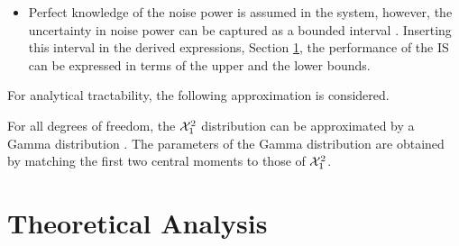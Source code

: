 \begin{itemize}
\item Perfect knowledge of the noise power is assumed in the system, however, the uncertainty in noise power can be captured as a bounded interval \cite{Tan08}. Inserting this interval in the derived expressions,  Section \ref{sec:ana}, the performance of the IS can be expressed in terms of the upper and the lower bounds. 
\end{itemize}
For analytical tractability, the following approximation is considered.
\begin{approxi} \label{ap:ap1}
\normalfont
For all degrees of freedom, the $\ncchi2$ distribution can be approximated by a Gamma distribution \cite{abramo}. The parameters of the Gamma distribution are obtained by matching the first two central moments to those of $\ncchi2$.
\end{approxi}


\section{Theoretical Analysis} \label{sec:ana}

